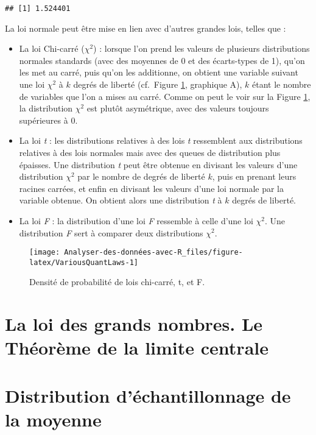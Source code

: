 \documentclass[
  french,
]{book}
\begin{document}
\begin{verbatim}
## [1] 1.524401
\end{verbatim}

La loi normale peut être mise en lien avec d'autres grandes lois, telles que :

\begin{itemize}
\item
  La loi Chi-carré (\(\chi^2\)) : lorsque l'on prend les valeurs de plusieurs distributions normales standards (avec des moyennes de 0 et des écarts-types de 1), qu'on les met au carré, puis qu'on les additionne, on obtient une variable suivant une loi \(\chi^2\) à \(k\) degrés de liberté (cf.~Figure \ref{fig:VariousQuantLaws}, graphique A), \(k\) étant le nombre de variables que l'on a mises au carré. Comme on peut le voir sur la Figure \ref{fig:VariousQuantLaws}, la distribution \(\chi^2\) est plutôt asymétrique, avec des valeurs toujours supérieures à 0.
\item
  La loi \emph{t} : les distributions relatives à des lois \emph{t} ressemblent aux distributions relatives à des lois normales mais avec des queues de distribution plus épaisses. Une distribution \emph{t} peut être obtenue en divisant les valeurs d'une distribution \(\chi^2\) par le nombre de degrés de liberté \(k\), puis en prenant leurs racines carrées, et enfin en divisant les valeurs d'une loi normale par la variable obtenue. On obtient alors une distribution \emph{t} à \(k\) degrés de liberté.
\item
  La loi \emph{F} : la distribution d'une loi \emph{F} ressemble à celle d'une loi \(\chi^2\). Une distribution \emph{F} sert à comparer deux distributions \(\chi^2\).
\end{itemize}

\begin{figure}

{\centering \texttt{[image: Analyser-des-données-avec-R\_files/figure-latex/VariousQuantLaws-1]} 

}

\caption{Densité de probabilité de lois chi-carré, t, et F.}\label{fig:VariousQuantLaws}
\end{figure}

\hypertarget{la-loi-des-grands-nombres.-le-thuxe9oruxe8me-de-la-limite-centrale}{%
\section{La loi des grands nombres. Le Théorème de la limite centrale}\label{la-loi-des-grands-nombres.-le-thuxe9oruxe8me-de-la-limite-centrale}}

\hypertarget{distribution-duxe9chantillonnage-de-la-moyenne}{%
\section{Distribution d'échantillonnage de la moyenne}\label{distribution-duxe9chantillonnage-de-la-moyenne}}

\printbibliography[title=Références, heading=bibintoc]
\end{document}
